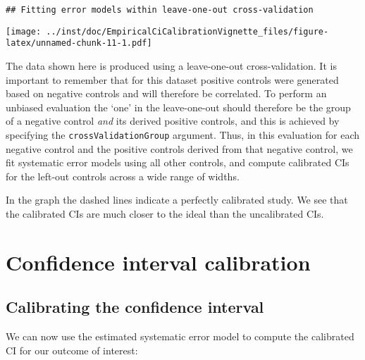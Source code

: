 \documentclass[]{article}
\newenvironment{Shaded}{\begin{snugshade}}{\end{snugshade}}
\newcommand{\KeywordTok}[1]{\textcolor[rgb]{0.13,0.29,0.53}{\textbf{#1}}}
\newcommand{\NormalTok}[1]{#1}
\newcommand{\OperatorTok}[1]{\textcolor[rgb]{0.81,0.36,0.00}{\textbf{#1}}}
\newcommand{\StringTok}[1]{\textcolor[rgb]{0.31,0.60,0.02}{#1}}
\begin{document}
\begin{verbatim}
## Fitting error models within leave-one-out cross-validation
\end{verbatim}

\texttt{[image: ../inst/doc/EmpiricalCiCalibrationVignette\_files/figure-latex/unnamed-chunk-11-1.pdf]}

The data shown here is produced using a leave-one-out cross-validation.
It is important to remember that for this dataset positive controls were
generated based on negative controls and will therefore be correlated.
To perform an unbiased evaluation the `one' in the leave-one-out should
therefore be the group of a negative control \emph{and} its derived
positive controls, and this is achieved by specifying the
\texttt{crossValidationGroup} argument. Thus, in this evaluation for
each negative control and the positive controls derived from that
negative control, we fit systematic error models using all other
controls, and compute calibrated CIs for the left-out controls across a
wide range of widths.

In the graph the dashed lines indicate a perfectly calibrated study. We
see that the calibrated CIs are much closer to the ideal than the
uncalibrated CIs.

\hypertarget{confidence-interval-calibration}{%
\section{Confidence interval
calibration}\label{confidence-interval-calibration}}

\hypertarget{calibrating-the-confidence-interval}{%
\subsection{Calibrating the confidence
interval}\label{calibrating-the-confidence-interval}}

We can now use the estimated systematic error model to compute the
calibrated CI for our outcome of interest:

\begin{Shaded}
\end{Shaded}
\end{document}
